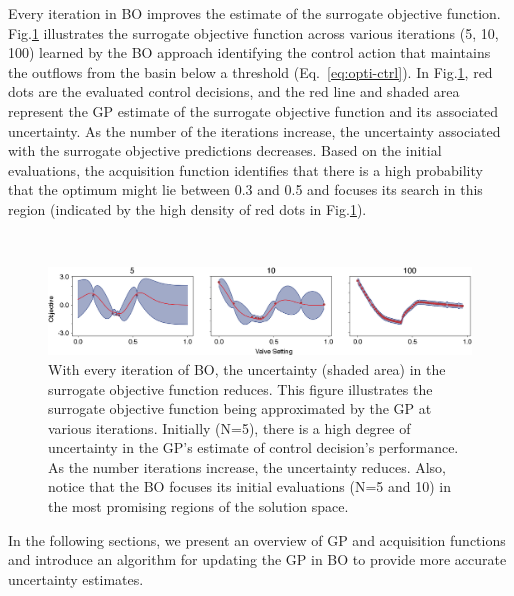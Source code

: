 Every iteration in BO improves the estimate of the surrogate objective function. 
Fig.\ref{fig:single-bayopt} illustrates the surrogate objective function across various iterations (5, 10, 100) learned by the BO approach identifying the control action that maintains the outflows from the basin below a threshold (Eq.~\ref{eq:opti-ctrl}).
In Fig.\ref{fig:single-bayopt}, red dots are the evaluated control decisions, and the red line and shaded area represent the GP estimate of the surrogate objective function and its associated uncertainty. 
As the number of the iterations increase, the uncertainty associated with the surrogate objective predictions decreases.
Based on the initial evaluations, the acquisition function identifies that there is a high probability that the optimum might lie between 0.3 and 0.5 and focuses its search in this region (indicated by the high density of red dots in Fig.\ref{fig:single-bayopt}).

\


\begin{figure}
	\includegraphics[width=\textwidth]{gfx/Chapter-4/bayesian_intro.eps}
	\caption{With every iteration of BO, the uncertainty (shaded area) in the surrogate objective function reduces. This figure illustrates the surrogate objective function being approximated by the GP at various iterations. Initially (N=5), there is a high degree of uncertainty in the GP's estimate of control decision's performance. As the number iterations increase, the uncertainty reduces. Also, notice that the BO focuses its initial evaluations  (N=5 and 10) in the most promising regions of the solution space.}\label{fig:single-bayopt}
\end{figure}

In the following sections, we present an overview of GP and acquisition functions and introduce an algorithm for updating the GP in BO to provide more accurate uncertainty estimates.


